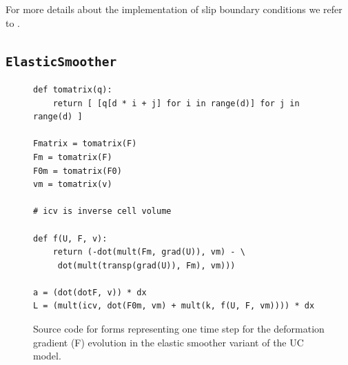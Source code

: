 For more details about the implementation of slip boundary conditions
we refer to \cite{Nazarov2009}.

\subsection{\tt ElasticSmoother}


\begin{figure}[!h]
{\small
\begin{lstlisting}
def tomatrix(q):
    return [ [q[d * i + j] for i in range(d)] for j in range(d) ]

Fmatrix = tomatrix(F)
Fm = tomatrix(F)
F0m = tomatrix(F0)
vm = tomatrix(v)

# icv is inverse cell volume

def f(U, F, v):
    return (-dot(mult(Fm, grad(U)), vm) - \
     dot(mult(transp(grad(U)), Fm), vm)))

a = (dot(dotF, v)) * dx
L = (mult(icv, dot(F0m, vm) + mult(k, f(U, F, vm)))) * dx
\end{lstlisting}
}
\caption{Source code for forms representing one time step for the deformation gradient (F) evolution in the elastic smoother variant of the UC model. }
\label{code:FFC_ElasticSmoother}
\end{figure}


